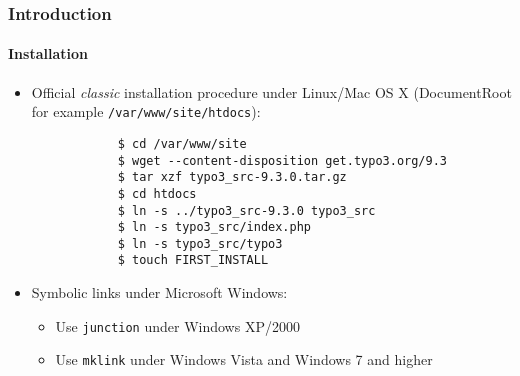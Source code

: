 \begin{frame}[fragile]
	\frametitle{Introduction}
	\framesubtitle{Installation}

	\begin{itemize}
		\item Official \textit{classic} installation procedure under Linux/Mac OS X\newline
			(DocumentRoot for example \texttt{/var/www/site/htdocs}):
		\begin{lstlisting}
			$ cd /var/www/site
			$ wget --content-disposition get.typo3.org/9.3
			$ tar xzf typo3_src-9.3.0.tar.gz
			$ cd htdocs
			$ ln -s ../typo3_src-9.3.0 typo3_src
			$ ln -s typo3_src/index.php
			$ ln -s typo3_src/typo3
			$ touch FIRST_INSTALL
		\end{lstlisting}

		\item Symbolic links under Microsoft Windows:

			\begin{itemize}
				\item Use \texttt{junction} under Windows XP/2000
				\item Use \texttt{mklink} under Windows Vista and Windows 7 and higher
			\end{itemize}

	\end{itemize}
\end{frame}

